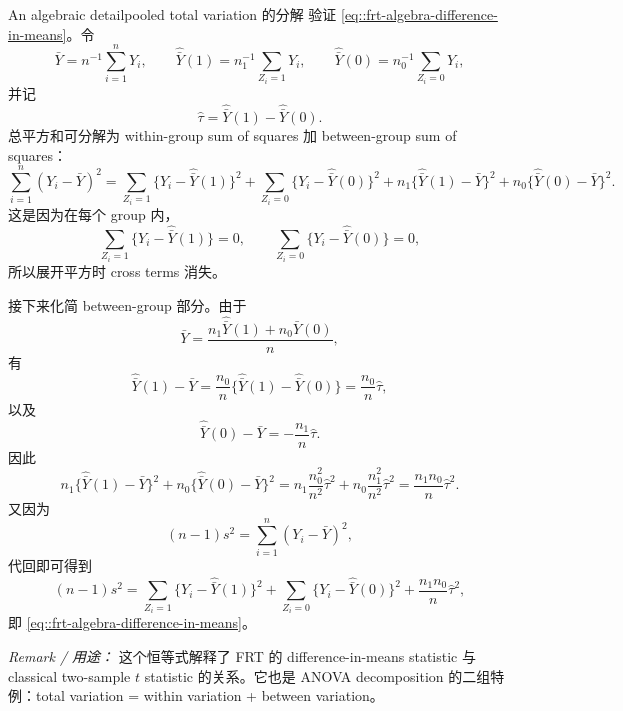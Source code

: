 \begin{exercisesolution}{An algebraic detail}{pooled total variation 的分解}
验证 \cref{eq::frt-algebra-difference-in-means}。令
\[
\bar Y=n^{-1}\sum_{i=1}^n Y_i,\qquad
\hat{\bar Y}(1)=n_1^{-1}\sum_{Z_i=1}Y_i,\qquad
\hat{\bar Y}(0)=n_0^{-1}\sum_{Z_i=0}Y_i,
\]
并记
\[
\hat\tau=\hat{\bar Y}(1)-\hat{\bar Y}(0).
\]
总平方和可分解为 within-group sum of squares 加 between-group sum of squares：
\[
\sum_{i=1}^n (Y_i-\bar Y)^2
=
\sum_{Z_i=1}\{Y_i-\hat{\bar Y}(1)\}^2
+
\sum_{Z_i=0}\{Y_i-\hat{\bar Y}(0)\}^2
+
n_1\{\hat{\bar Y}(1)-\bar Y\}^2
+
n_0\{\hat{\bar Y}(0)-\bar Y\}^2.
\]
这是因为在每个 group 内，
\[
\sum_{Z_i=1}\{Y_i-\hat{\bar Y}(1)\}=0,\qquad
\sum_{Z_i=0}\{Y_i-\hat{\bar Y}(0)\}=0,
\]
所以展开平方时 cross terms 消失。

接下来化简 between-group 部分。由于
\[
\bar Y=\frac{n_1\hat{\bar Y}(1)+n_0\hat{\bar Y}(0)}{n},
\]
有
\[
\hat{\bar Y}(1)-\bar Y
=\frac{n_0}{n}\{\hat{\bar Y}(1)-\hat{\bar Y}(0)\}
=\frac{n_0}{n}\hat\tau,
\]
以及
\[
\hat{\bar Y}(0)-\bar Y
=-\frac{n_1}{n}\hat\tau.
\]
因此
\[
n_1\{\hat{\bar Y}(1)-\bar Y\}^2
+
n_0\{\hat{\bar Y}(0)-\bar Y\}^2
=
n_1\frac{n_0^2}{n^2}\hat\tau^2
+
n_0\frac{n_1^2}{n^2}\hat\tau^2
=\frac{n_1n_0}{n}\hat\tau^2.
\]
又因为
\[
(n-1)s^2=\sum_{i=1}^n(Y_i-\bar Y)^2,
\]
代回即可得到
\[
(n-1)s^2
=
\sum_{Z_i=1}\{Y_i-\hat{\bar Y}(1)\}^2
+
\sum_{Z_i=0}\{Y_i-\hat{\bar Y}(0)\}^2
+
\frac{n_1n_0}{n}\hat\tau^2,
\]
即 \cref{eq::frt-algebra-difference-in-means}。

\emph{Remark / 用途：} 这个恒等式解释了 FRT 的 difference-in-means statistic 与 classical two-sample $t$ statistic 的关系。它也是 ANOVA decomposition 的二组特例：total variation = within variation + between variation。
\end{exercisesolution}
